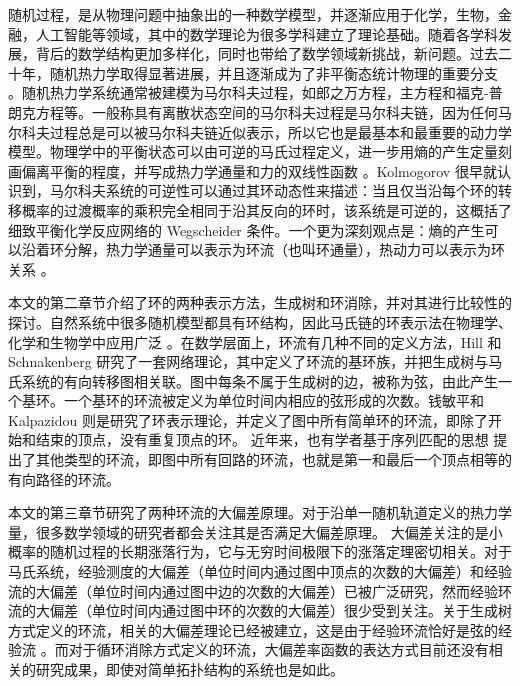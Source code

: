 

随机过程，是从物理问题中抽象出的一种数学模型，并逐渐应用于化学，生物，金融，人工智能等领域，其中的数学理论为很多学科建立了理论基础。随着各学科发展，背后的数学结构更加多样化，同时也带给了数学领域新挑战，新问题。过去二十年，随机热力学取得显著进展，并且逐渐成为了非平衡态统计物理的重要分支 \cite{annurev-conmatphys,Seifert_2012,VANDENBROECK20156} 。随机热力学系统通常被建模为马尔科夫过程，如郎之万方程，主方程和福克-普朗克方程等。一般称具有离散状态空间的马尔科夫过程是马尔科夫链，因为任何马尔科夫过程总是可以被马尔科夫链近似表示，所以它也是最基本和最重要的动力学模型。物理学中的平衡状态可以由可逆的马氏过程定义，进一步用熵的产生定量刻画偏离平衡的程度，并写成热力学通量和力的双线性函数 \cite{PhysRev.91.1505}。Kolmogorov \cite{Math.Ann.112} 很早就认识到，马尔科夫系统的可逆性可以通过其环动态性来描述：当且仅当沿每个环的转移概率的过渡概率的乘积完全相同于沿其反向的环时，该系统是可逆的，这概括了细致平衡化学反应网络的 Wegscheider 条件。一个更为深刻观点是：熵的产生可以沿着环分解，热力学通量可以表示为环流（也叫环通量），热动力可以表示为环关系 \cite{Schnakenberg1976NetworkTO}。

本文的第二章节介绍了环的两种表示方法，生成树和环消除，并对其进行比较性的探讨。自然系统中很多随机模型都具有环结构，因此马氏链的环表示法在物理学、化学和生物学中应用广泛 \cite{ZHANG20121,GE201287}。在数学层面上，环流有几种不同的定义方法，Hill \cite{Hill1966StudiesIIa,Hill1966StudiesIIb,hill2013free} 和 Schnakenberg \cite{Schnakenberg1976NetworkTO} 研究了一套网络理论，其中定义了环流的基环族，并把生成树与马氏系统的有向转移图相关联。图中每条不属于生成树的边，被称为弦，由此产生一个基环。一个基环的环流被定义为单位时间内相应的弦形成的次数。钱敏平\cite{minping1982circulation,jian1984circulations,jiang2004mathematical}和 Kalpazidou \cite{kalpazidou2007cycle} 则是研究了环表示理论，并定义了图中所有简单环的环流，即除了开始和结束的顶点，没有重复顶点的环。
近年来，也有学者基于序列匹配的思想 \cite{roldan2019exact,biddle2020reversal,pietzonka2021cycle} 提出了其他类型的环流，即图中所有回路的环流，也就是第一和最后一个顶点相等的有向路径的环流。

本文的第三章节研究了两种环流的大偏差原理。对于沿单一随机轨道定义的热力学量，很多数学领域的研究者都会关注其是否满足大偏差原理\cite{varadhan1984large,den2000large}。
大偏差关注的是小概率的随机过程的长期涨落行为，它与无穷时间极限下的涨落定理密切相关。对于马氏系统，经验测度的大偏差（单位时间内通过图中顶点的次数的大偏差）和经验流的大偏差（单位时间内通过图中边的次数的大偏差）已被广泛研究，然而经验环流的大偏差（单位时间内通过图中环的次数的大偏差）很少受到关注。关于生成树方式定义的环流，相关的大偏差理论已经被建立，这是由于经验环流恰好是弦的经验流 \cite{bertini2015flows,bertini2015large}。而对于循环消除方式定义的环流，大偏差率函数的表达方式目前还没有相关的研究成果，即使对简单拓扑结构的系统也是如此。

